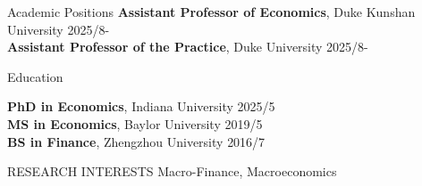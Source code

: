 \documentclass{resume} %
\begin{document}

\begin{rSection}{Academic Positions}
{\bf Assistant Professor of Economics}, Duke Kunshan University \hfill {2025/8-}\\
{\bf Assistant Professor of the Practice}, Duke University \hfill {2025/8-}
\end{rSection}


\begin{rSection}{Education}

{\bf PhD in Economics}, Indiana University \hfill {2025/5}\\
{\bf MS in Economics}, Baylor University \hfill {2019/5}\\
{\bf BS in Finance}, Zhengzhou University \hfill {2016/7}


\end{rSection}



\begin{rSection}{RESEARCH INTERESTS}
Macro-Finance, Macroeconomics
\end{rSection}
 
\end{document}
